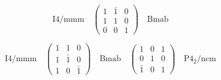 \[
    \text{I4/mmm} \quad 
    \begin{pmatrix}
    1 & \bar{1} & 0 \\
    1 & 1 & 0 \\
    0 & 0 & 1
    \end{pmatrix}
    \quad \text{Bmab}
\]

\[
    \text{I4/mmm} \quad 
    \begin{pmatrix}
    1 & 1 & 0 \\
    1 & \bar{1} & 0 \\
    1 & 0 & \bar{1}
    \end{pmatrix}
    \quad \text{Bmab} \quad
    \begin{pmatrix}
    1 & 0 & 1 \\
    0 & 1 & 0 \\
    \bar{1} & 0 & 1
    \end{pmatrix} 
    \quad \text{P4}_2\text{/ncm}
\]